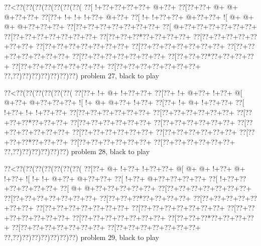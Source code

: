 \vbox{\vbox{\goo
\0??<\0??(\0??(\0??(\0??(\0??(\0??(\0??(
\0??[\- !+\0??+\0??+\0??+\0??+\- @+\0??+
\0??[\0??+\0??+\- @+\- @+\- @+\0??+\0??+
\0??[\0??+\- !+\- !+\- !+\0??+\- @+\0??+
\0??[\- !+\- !+\0??+\0??+\- @+\0??+\0??+
\- ![\- @+\- @+\- @+\- @+\0??+\0??+\0??+
\0??[\0??+\0??+\0??+\0??+\0??+\0??+\0??+
\0??[\- @+\0??+\0??+\0??+\0??+\0??+\0??+
\0??[\0??+\0??+\0??+\0??+\0??+\0??+\0??+
\0??[\0??+\0??+\0??*\0??+\0??+\0??+\0??+
\0??[\0??+\0??+\0??+\0??+\0??+\0??+\0??+
\0??[\0??+\0??+\0??+\0??+\0??+\0??+\0??+
\0??[\0??+\0??+\0??+\0??+\0??+\0??+\0??+
\0??[\0??+\0??+\0??+\0??+\0??+\0??+\0??+
\0??[\0??+\0??+\0??+\0??+\0??+\0??+\0??+
\0??[\0??+\0??+\0??*\0??+\0??+\0??+\0??+
\0??[\0??+\0??+\0??+\0??+\0??+\0??+\0??+
\0??[\0??+\0??+\0??+\0??+\0??+\0??+\0??+
\0??,\0??)\0??)\0??)\0??)\0??)\0??)\0??)
}
\hfil problem 27, black to play\hfil\break
}

\vbox{\vbox{\goo
\0??<\0??(\0??(\0??(\0??(\0??(\0??(
\0??[\0??+\- !+\- @+\- !+\0??+\0??+
\0??[\0??+\- !+\- @+\0??+\- !+\0??+
\- @[\- @+\0??+\- @+\0??+\0??+\0??+
\- ![\- !+\- @+\- @+\0??+\- !+\0??+
\0??[\0??+\- !+\- @+\- !+\0??+\0??+
\0??[\- !+\0??+\- !+\- !+\0??+\0??+
\0??[\0??+\0??+\0??+\0??+\0??+\0??+
\0??[\0??+\0??+\0??+\0??+\0??+\0??+
\0??[\0??+\0??+\0??*\0??+\0??+\0??+
\0??[\0??+\0??+\0??+\0??+\0??+\0??+
\0??[\0??+\0??+\0??+\0??+\0??+\0??+
\0??[\0??+\0??+\0??+\0??+\0??+\0??+
\0??[\0??+\0??+\0??+\0??+\0??+\0??+
\0??[\0??+\0??+\0??+\0??+\0??+\0??+
\0??[\0??+\0??+\0??*\0??+\0??+\0??+
\0??[\0??+\0??+\0??+\0??+\0??+\0??+
\0??[\0??+\0??+\0??+\0??+\0??+\0??+
\0??,\0??)\0??)\0??)\0??)\0??)\0??)
}
\hfil problem 28, black to play\hfil\break
}

\vbox{\vbox{\goo
\0??<\0??(\0??(\0??(\0??(\0??(\0??(\0??(
\0??[\0??+\- @+\- !+\0??+\- !+\0??+\0??+
\- @[\- @+\- @+\- !+\0??+\- @+\- !+\0??+
\- ![\- !+\- !+\- @+\0??+\- @+\0??+\0??+
\0??[\- !+\0??+\- @+\0??+\0??+\0??+\0??+
\0??[\- !+\0??+\0??+\0??+\0??+\0??+\0??+
\0??[\- @+\- @+\0??+\0??+\0??+\0??+\0??+
\0??[\0??+\0??+\0??+\0??+\0??+\0??+\0??+
\0??[\0??+\0??+\0??+\0??+\0??+\0??+\0??+
\0??[\0??+\0??+\0??*\0??+\0??+\0??+\0??+
\0??[\0??+\0??+\0??+\0??+\0??+\0??+\0??+
\0??[\0??+\0??+\0??+\0??+\0??+\0??+\0??+
\0??[\0??+\0??+\0??+\0??+\0??+\0??+\0??+
\0??[\0??+\0??+\0??+\0??+\0??+\0??+\0??+
\0??[\0??+\0??+\0??+\0??+\0??+\0??+\0??+
\0??[\0??+\0??+\0??*\0??+\0??+\0??+\0??+
\0??[\0??+\0??+\0??+\0??+\0??+\0??+\0??+
\0??[\0??+\0??+\0??+\0??+\0??+\0??+\0??+
\0??,\0??)\0??)\0??)\0??)\0??)\0??)\0??)
}
\hfil problem 29, black to play\hfil\break
}


